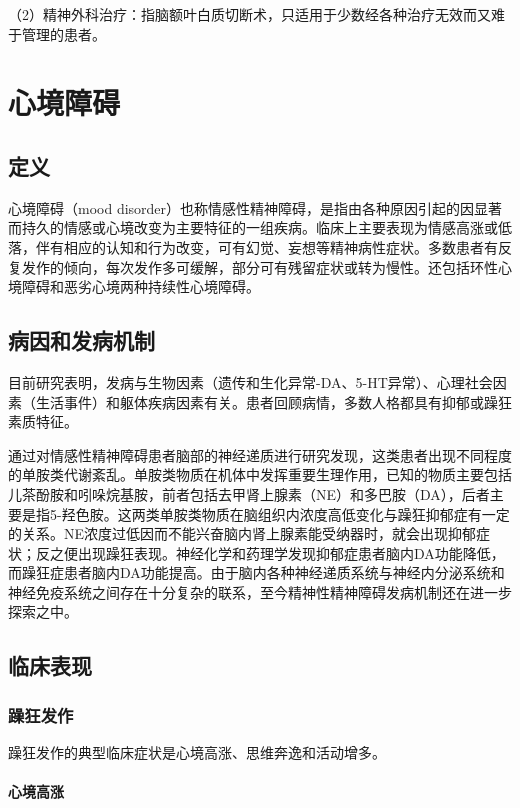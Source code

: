 （2）精神外科治疗：指脑额叶白质切断术，只适用于少数经各种治疗无效而又难于管理的患者。

\section{心境障碍}

\subsection{定义}

心境障碍（mood
disorder）也称情感性精神障碍，是指由各种原因引起的因显著而持久的情感或心境改变为主要特征的一组疾病。临床上主要表现为情感高涨或低落，伴有相应的认知和行为改变，可有幻觉、妄想等精神病性症状。多数患者有反复发作的倾向，每次发作多可缓解，部分可有残留症状或转为慢性。还包括环性心境障碍和恶劣心境两种持续性心境障碍。

\subsection{病因和发病机制}

目前研究表明，发病与生物因素（遗传和生化异常-DA、5-HT异常）、心理社会因素（生活事件）和躯体疾病因素有关。患者回顾病情，多数人格都具有抑郁或躁狂素质特征。

通过对情感性精神障碍患者脑部的神经递质进行研究发现，这类患者出现不同程度的单胺类代谢紊乱。单胺类物质在机体中发挥重要生理作用，已知的物质主要包括儿茶酚胺和吲哚烷基胺，前者包括去甲肾上腺素（NE）和多巴胺（DA），后者主要是指5-羟色胺。这两类单胺类物质在脑组织内浓度高低变化与躁狂抑郁症有一定的关系。NE浓度过低因而不能兴奋脑内肾上腺素能受纳器时，就会出现抑郁症状；反之便出现躁狂表现。神经化学和药理学发现抑郁症患者脑内DA功能降低，而躁狂症患者脑内DA功能提高。由于脑内各种神经递质系统与神经内分泌系统和神经免疫系统之间存在十分复杂的联系，至今精神性精神障碍发病机制还在进一步探索之中。

\subsection{临床表现}

\subsubsection{躁狂发作}

躁狂发作的典型临床症状是心境高涨、思维奔逸和活动增多。
\paragraph{心境高涨}

